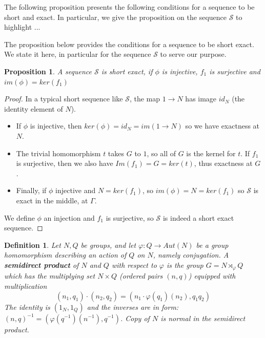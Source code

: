 \documentclass[12pt]{article}
\newtheorem{proposition}[theorem]{Proposition}
\newtheorem{definition}[theorem]{Definition}
\numberwithin{theorem}{section}
\numberwithin{equation}{theorem}
\begin{document}
The following proposition presents the following conditions for a sequence to be short and exact. In particular, we give the proposition on the sequence $\mathcal{S}$ to highlight ...

The proposition below provides the conditions for a sequence to be short exact. We state it here, in particular for the sequence $\mathcal{S}$ to serve our purpose.
\begin{proposition}
    A sequence $\mathcal{S}$ is short exact, if $\phi$ is injective, $f_1$ is surjective and $im(\phi) = ker(f_1)$
\end{proposition}
\begin{proof}
    In a typical short sequence like $\mathcal{S}$, the map $1 \to N$ has image ${id_N}$ (the identity element of $N$). 
    \begin{itemize}
        \item If $\phi$ is injective, then $ker(\phi) = {id_N} = im(1 \to N)$ so we have exactness at $N$.
        \item The trivial homomorphism $t$ takes $G$ to $1$, so all of $G$ is the kernel for $t$. If $f_1$ is surjective, then we also have $Im(f_1) = G = ker(t)$, thus exactness at $G$.
        \item Finally, if $\phi$ injective and $N = ker(f_1)$, so $im(\phi) = N = ker(f_1)$ so $\mathcal{S}$ is exact in the middle, at $\Gamma$.
    \end{itemize}
    We define $\phi$ an injection and $f_1$ is surjective, so $\mathcal{S}$ is indeed a short exact sequence.
\end{proof}

\begin{definition}
    Let $N, Q$ be groups, and let $\varphi : Q \to Aut(N)$ be a group homomorphism describing an action of $Q$ on $N$, namely conjugation. A \textbf{semidirect product} of $N$ and $Q$ with respect to $\varphi$ is the group $G = N \rtimes_\varphi Q$ which has the multiplying set $N \times Q$ (ordered pairs $(n, q)$) equipped with multiplication 
    $$
    (n_1, q_1) \cdot (n_2, q_2) = (n_1 \cdot \varphi(q_1)(n_2), q_1q_2)
    $$ 
    The identity is $(1_N, 1_Q)$ and the inverses are in form: $(n, q)^{-1} = (\varphi(q^{-1})(n^{-1}), q^{-1})$. Copy of $N$ is normal in the semidirect product.
\end{definition}
\end{document}
